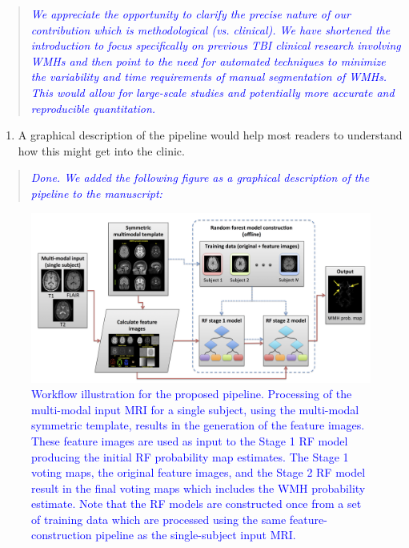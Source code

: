 \documentclass[12pt,]{article}
\providecommand{\tightlist}{%
  \setlength{\itemsep}{0pt}\setlength{\parskip}{0pt}}
\begin{document}
\begin{quote}
\emph{\textcolor{blue}{We appreciate
the opportunity to clarify the precise nature of our contribution which is methodological
(vs. clinical).  We have shortened the introduction to focus specifically on previous TBI
clinical research involving WMHs and then point to the need for automated
techniques to minimize the variability and time requirements of manual
segmentation of WMHs.  This would allow for large-scale studies and potentially more accurate
and reproducible quantitation.
}}
\end{quote}

\begin{enumerate}
\def\labelenumi{\arabic{enumi}.}
\setcounter{enumi}{1}
\tightlist
\item
  A graphical description of the pipeline would help most readers to
  understand how this might get into the clinic.
\end{enumerate}

\begin{quote}
\emph{\textcolor{blue}{Done.  We added the following figure as a graphical description of
the pipeline to the manuscript:}}
\end{quote}

\begin{figure}[htbp]
\centering
\includegraphics{Figures/wmhPipeline.png}
\caption{\textcolor{blue}{Workflow illustration for the proposed pipeline.  Processing of the multi-modal
input MRI for a single subject, using the multi-modal symmetric template, results in
the generation of the feature images.  These feature images are used as input to the
Stage 1 RF model producing the initial RF probability map estimates.  The Stage 1
voting maps, the original feature images, and the Stage 2 RF model result in the
final voting maps which includes the WMH probability estimate.  Note that the RF models
are constructed once from a set of training data which are processed using the
same feature-construction pipeline as the single-subject input MRI.}}
\end{figure}
\end{document}
